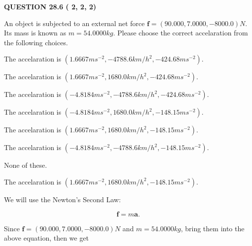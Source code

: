 \documentclass[12pt]{article}
\begin{document}
   
  
\vspace{0.2in}
  
{\textbf{\Large{QUESTION
28.6 
 (          2,          2,          2)
}}}
  
  
 
An object is subjected to an external net force $\mathbf{f}=(
90.000 ,
7.0000,
-8000.0  )N$. Its mass is known as
$m= %
54.0000  kg$. Please choose the correct accelaration
from the following choices.
 
 
 
The accelaration is
$(
1.6667ms^{-2},
-4788.6km/h^2,
-424.68ms^{-2}
).
$
 
 
The accelaration is
$(
1.6667ms^{-2},
1680.0km/h^2,
-424.68ms^{-2}
).
$
 
 
The accelaration is
$(
-4.8184ms^{-2},
-4788.6km/h^2,
-424.68ms^{-2}
).
$
 
 
The accelaration is
$(
-4.8184ms^{-2},
1680.0km/h^2,
-148.15ms^{-2}
).
$
 
 
The accelaration is
$(
1.6667ms^{-2},
1680.0km/h^2,
-148.15ms^{-2}
).
$
 
 
The accelaration is
$(
-4.8184ms^{-2},
-4788.6km/h^2,
-148.15ms^{-2}
).
$
 
 
 None of these.
 
 
\noindent{}
 
 
The accelaration is
$(
1.6667ms^{-2},
1680.0km/h^2,
-148.15ms^{-2}
).
$
 
 
\noindent{}
 
 
 
 
 
 
\noindent{}
 
 

We will use the Newton's Second Law:
 
\[
\mathbf{f}=m\mathbf{a}.
\]
 
Since $\mathbf{f}=( %
90.000,  %
7.0000,  %
-8000.0 )N$
and $m= %
54.0000kg$, bring them into the above equation, then we get
 
\end{document}
